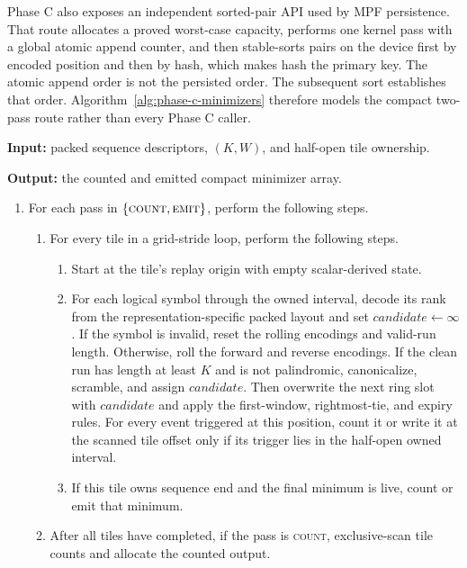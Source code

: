 Phase C also exposes an independent sorted-pair API used by MPF persistence.
That route allocates a proved worst-case capacity, performs one kernel pass
with a global atomic append counter, and then stable-sorts pairs on the device
first by encoded position and then by hash, which makes hash the primary key.
The atomic append order is not the persisted order. The subsequent sort
establishes that order. Algorithm~\ref{alg:phase-c-minimizers} therefore models
the compact two-pass route rather than every Phase C caller.

\begin{algorithm}[H]
\caption{Phase C compact count/scan/emit minimizer extraction}
\label{alg:phase-c-minimizers}
\small
\textbf{Input:} packed sequence descriptors, \((K,W)\), and half-open tile
ownership.

\textbf{Output:} the counted and emitted compact minimizer array.

\begin{enumerate}
  \item For each pass in
    \(\{\textsc{count},\textsc{emit}\}\), perform the following steps.
    \begin{enumerate}
      \item For every tile in a grid-stride loop, perform the following steps.
        \begin{enumerate}
          \item Start at the tile's replay origin with empty scalar-derived
            state.
          \item For each logical symbol through the owned interval, decode its
            rank from the representation-specific packed layout and set
            \(\textit{candidate}\gets\infty\). If the symbol is invalid, reset
            the rolling encodings and valid-run length. Otherwise, roll the
            forward and reverse encodings. If the clean run has length at
            least \(K\) and is not palindromic, canonicalize, scramble, and
            assign \(\textit{candidate}\). Then overwrite the next ring slot
            with \(\textit{candidate}\) and apply the first-window,
            rightmost-tie, and expiry rules. For every event triggered at this
            position, count it or write it at the scanned tile offset only if
            its trigger lies in the half-open owned interval.
          \item If this tile owns sequence end and the final minimum is live,
            count or emit that minimum.
        \end{enumerate}
      \vspace{0.25\baselineskip}
      \item After all tiles have completed, if the pass is \textsc{count},
        exclusive-scan tile counts and allocate the counted output.
    \end{enumerate}
\end{enumerate}
\end{algorithm}

